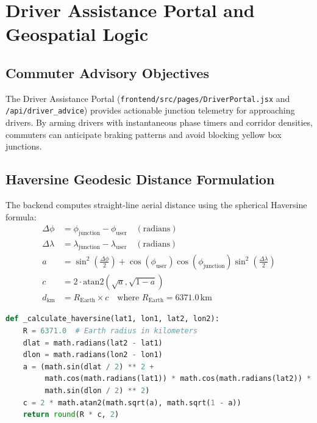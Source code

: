 \chapter{Driver Assistance Portal and Geospatial Logic}

\section{Commuter Advisory Objectives}
The Driver Assistance Portal (\texttt{frontend/src/pages/DriverPortal.jsx} and \texttt{/api/driver\_advice}) provides actionable junction telemetry for approaching drivers. By arming drivers with instantaneous phase timers and corridor densities, commuters can anticipate braking patterns and avoid blocking yellow box junctions.

\section{Haversine Geodesic Distance Formulation}
The backend computes straight-line aerial distance using the spherical Haversine formula:
\begin{align}
\Delta\phi &= \phi_{\text{junction}} - \phi_{\text{user}} \quad (\text{radians}) \\
\Delta\lambda &= \lambda_{\text{junction}} - \lambda_{\text{user}} \quad (\text{radians}) \\
a &= \sin^2\left(\frac{\Delta\phi}{2}\right) + \cos(\phi_{\text{user}}) \cos(\phi_{\text{junction}}) \sin^2\left(\frac{\Delta\lambda}{2}\right) \\
c &= 2 \cdot \text{atan2}\left(\sqrt{a}, \sqrt{1 - a}\right) \\
d_{\text{km}} &= R_{\text{Earth}} \times c \quad \text{where } R_{\text{Earth}} = 6371.0\,\text{km}
\end{align}

\begin{lstlisting}[language=Python,caption={Haversine Distance Implementation in Python}]
def _calculate_haversine(lat1, lon1, lat2, lon2):
    R = 6371.0  # Earth radius in kilometers
    dlat = math.radians(lat2 - lat1)
    dlon = math.radians(lon2 - lon1)
    a = (math.sin(dlat / 2) ** 2 +
         math.cos(math.radians(lat1)) * math.cos(math.radians(lat2)) *
         math.sin(dlon / 2) ** 2)
    c = 2 * math.atan2(math.sqrt(a), math.sqrt(1 - a))
    return round(R * c, 2)
\end{lstlisting}

